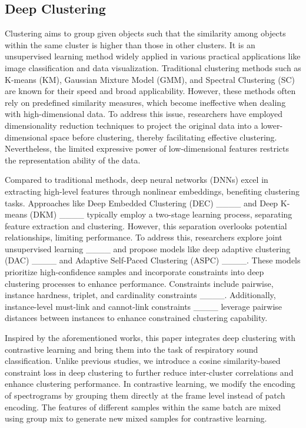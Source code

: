 \subsection{Deep Clustering}
Clustering aims to group given objects such that the similarity among objects within the same cluster is higher than those in other clusters. It is an unsupervised learning method widely applied in various practical applications like image classification and data visualization. Traditional clustering methods such as K-means (KM), Gaussian Mixture Model (GMM), and Spectral Clustering (SC) are known for their speed and broad applicability. However, these methods often rely on predefined similarity measures, which become ineffective when dealing with high-dimensional data. To address this issue, researchers have employed dimensionality reduction techniques to project the original data into a lower-dimensional space before clustering, thereby facilitating effective clustering. Nevertheless, the limited expressive power of low-dimensional features restricts the representation ability of the data.


Compared to traditional methods, deep neural networks (DNNs) excel in extracting high-level features through nonlinear embeddings, benefiting clustering tasks. Approaches like Deep Embedded Clustering (DEC) ____ and Deep K-means (DKM) ____ typically employ a two-stage learning process, separating feature extraction and clustering. However, this separation overlooks potential relationships, limiting performance. To address this, researchers explore joint unsupervised learning ____ and propose models like deep adaptive clustering (DAC) ____ and Adaptive Self-Paced Clustering (ASPC) ____. These models prioritize high-confidence samples and incorporate constraints into deep clustering processes to enhance performance. Constraints include pairwise, instance hardness, triplet, and cardinality constraints ____. Additionally, instance-level must-link and cannot-link constraints ____ leverage pairwise distances between instances to enhance constrained clustering capability.




Inspired by the aforementioned works, this paper integrates deep clustering with contrastive learning and bring them into the task of respiratory sound classification. Unlike previous studies, we introduce a cosine similarity-based constraint loss in deep clustering to further reduce inter-cluster correlations and enhance clustering performance. In contrastive learning, we modify the encoding of spectrograms by grouping them directly at the frame level instead of patch encoding. The features of different samples within the same batch are mixed using group mix to generate new mixed samples for contrastive learning.